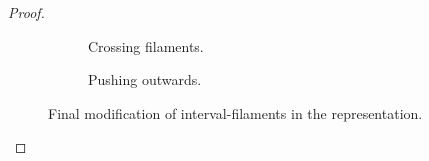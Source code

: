 \begin{proof}
	\begin{figure}[!ht]\centering
		\begin{subfigure}{0.45\textwidth}\centering
			\caption{Crossing filaments.}
			\label{left}
		\end{subfigure}
		\begin{subfigure}{0.45\textwidth}\centering
			\caption{Pushing outwards.}
			\label{right}
		\end{subfigure}
		\caption{Final modification of interval-filaments in the representation.}
	\end{figure}
\end{proof}